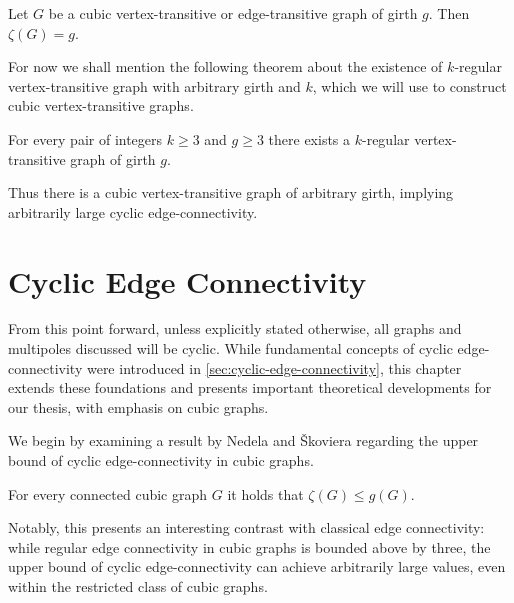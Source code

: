 \documentclass[12pt, twoside]{book}
\begin{document}
\begin{theorem}\label{th:cyclic-connectivity-of-transitive}
	Let $G$ be a cubic \mbox{vertex-transitive} or \mbox{edge-transitive} graph of girth $g$. Then $\zeta(G) = g$.
\end{theorem}

For now we shall mention the following theorem about the existence of $k$-regular vertex-transitive graph with arbitrary girth and $k$, which we will use to construct cubic vertex-transitive graphs.

\begin{theorem}\label{th:vertex-transitive-girth-regular}
	For every pair of integers $k \geq 3$ and $g \geq 3$ there exists a $k$-regular vertex-transitive graph of girth $g$.
\end{theorem}

Thus there is a cubic vertex-transitive graph of arbitrary girth, implying arbitrarily large cyclic \mbox{edge-connectivity}.

\chapter{Cyclic Edge Connectivity}\label{ch:cyclic-edge-connectivity}

From this point forward, unless explicitly stated otherwise, all graphs and multipoles discussed will be cyclic. While fundamental concepts of cyclic edge-connectivity were introduced in \cref{sec:cyclic-edge-connectivity}, this chapter extends these foundations and presents important theoretical developments for our thesis, with emphasis on cubic graphs.


We begin by examining a result by Nedela and Škoviera regarding the upper bound of cyclic edge-connectivity in cubic graphs. 

\begin{proposition}\label{prop:cyclic-con-less-than-girth}
	For every connected cubic graph $G$ it holds that $\zeta(G)\leq g(G)$.
\end{proposition}

Notably, this presents an interesting contrast with classical edge connectivity: while regular edge connectivity in cubic graphs is bounded above by three, the upper bound of cyclic edge-connectivity can achieve arbitrarily large values, even within the restricted class of cubic graphs.
\end{document}
